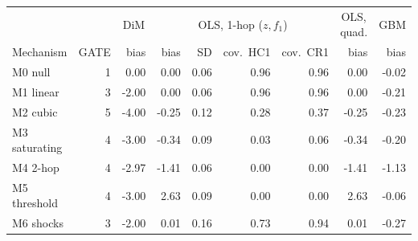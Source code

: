 \begin{tabular}{lrrrrrrrr}
\toprule
 & & \multicolumn{1}{c}{DiM} & \multicolumn{4}{c}{OLS, 1-hop ($z,f_1$)} & \multicolumn{1}{c}{OLS, quad.} & \multicolumn{1}{c}{GBM} \\
\cmidrule(lr){4-7}
Mechanism & GATE & bias & bias & SD & cov.\ HC1 & cov.\ CR1 & bias & bias \\
\midrule
M0 null & 1 & 0.00 & 0.00 & 0.06 & 0.96 & 0.96 & 0.00 & -0.02 \\
M1 linear & 3 & -2.00 & 0.00 & 0.06 & 0.96 & 0.96 & 0.00 & -0.21 \\
M2 cubic & 5 & -4.00 & -0.25 & 0.12 & 0.28 & 0.37 & -0.25 & -0.23 \\
M3 saturating & 4 & -3.00 & -0.34 & 0.09 & 0.03 & 0.06 & -0.34 & -0.20 \\
M4 2-hop & 4 & -2.97 & -1.41 & 0.06 & 0.00 & 0.00 & -1.41 & -1.13 \\
M5 threshold & 4 & -3.00 & 2.63 & 0.09 & 0.00 & 0.00 & 2.63 & -0.06 \\
M6 shocks & 3 & -2.00 & 0.01 & 0.16 & 0.73 & 0.94 & 0.01 & -0.27 \\
\bottomrule
\end{tabular}
